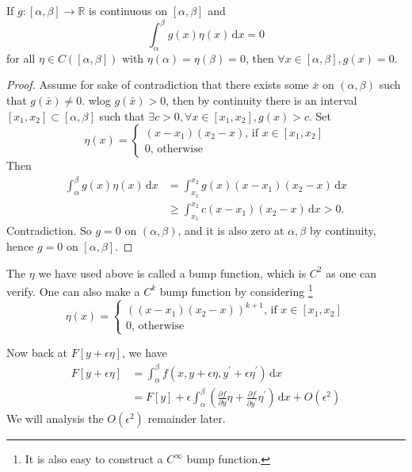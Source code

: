 \documentclass{article}
\begin{document}
\begin{lemma}\label{fund_lemma}
    If $g:[\alpha,\beta]\to\mathbb R$ is continuous on $[\alpha,\beta]$ and
    $$\int_\alpha^\beta g(x)\eta(x)\,\mathrm dx=0$$
    for all $\eta\in C([\alpha,\beta])$ with $\eta(\alpha)=\eta(\beta)=0$, then $\forall x\in [\alpha,\beta],g(x)=0$.
\end{lemma}
\begin{proof}
    Assume for sake of contradiction that there exists some $\bar{x}$ on $(\alpha,\beta)$ such that $g(\bar{x})\neq 0$.
    wlog $g(\bar{x})>0$, then by continuity there is an interval $[x_1,x_2]\subset[\alpha,\beta]$ such that $\exists c>0,\forall x\in [x_1,x_2],g(x)>c$.
    Set
    $$\eta(x)=\begin{cases}
        (x-x_1)(x_2-x)\text{, if $x\in [x_1,x_2]$}\\
        0\text{, otherwise}
    \end{cases}$$
    Then
    \begin{align*}
        \int_\alpha^\beta g(x)\eta(x)\,\mathrm dx
        &=\int_{x_1}^{x_2}g(x)(x-x_1)(x_2-x)\,\mathrm dx\\
        &\ge\int_{x_1}^{x_2}c(x-x_1)(x_2-x)\,\mathrm dx>0.
    \end{align*}
    Contradiction.
    So $g=0$ on $(\alpha,\beta)$, and it is also zero at $\alpha,\beta$ by continuity, hence $g=0$ on $[\alpha,\beta]$.
\end{proof}
\begin{remark}
    The $\eta$ we have used above is called a bump function, which is $C^2$ as one can verify.
    One can also make a $C^k$ bump function by considering
    \footnote{It is also easy to construct a $C^{\infty}$ bump function.}
    $$\eta(x)=\begin{cases}
    ((x-x_1)(x_2-x))^{k+1}\text{, if $x\in [x_1,x_2]$}\\
    0\text{, otherwise}
\end{cases}$$
\end{remark}
Now back at $F[y+\epsilon\eta]$, we have
\begin{align*}
    F[y+\epsilon\eta]&=\int_\alpha^\beta f(x,y+\epsilon\eta,y^\prime+\epsilon\eta^\prime)\,\mathrm dx\\
    &=F[y]+\epsilon\int_\alpha^\beta\left( \frac{\partial f}{\partial y}\eta+\frac{\partial f}{\partial y^\prime}\eta^\prime \right)\,\mathrm dx+O(\epsilon^2)
\end{align*}
We will analysis the $O(\epsilon^2)$ remainder later.
\end{document}
